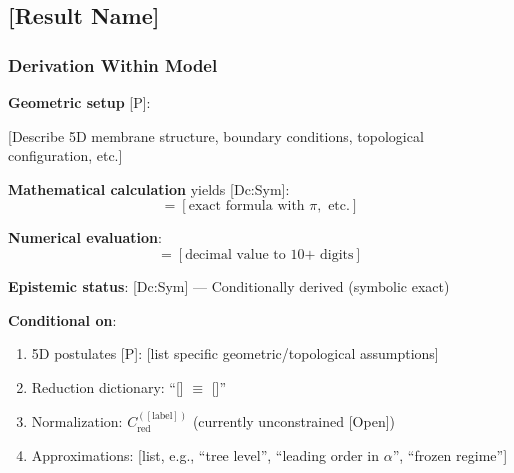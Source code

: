 
\subsection{[Result Name]}
\label{sec:[result_label]}


\subsubsection{Derivation Within Model}

\textbf{Geometric setup} [P]:

[Describe 5D membrane structure, boundary conditions, topological configuration, etc.]

\textbf{Mathematical calculation} yields [Dc:Sym]:
\begin{equation}
  [\text{quantity}] = [\text{exact formula with } \pi, \text{ etc.}]
  \label{eq:[result_formula]}
\end{equation}

\textbf{Numerical evaluation}:
\begin{equation}
  [\text{quantity}] = [\text{decimal value to 10+ digits}]
\end{equation}

\textbf{Epistemic status}: [Dc:Sym] --- Conditionally derived (symbolic exact)

\textbf{Conditional on}:
\begin{enumerate}
\item 5D postulates [P]: [list specific geometric/topological assumptions]
\item Reduction dictionary: ``[] $\equiv$ []''
\item Normalization: $C_{\mathrm{red}}^{([\text{label}])}$ (currently unconstrained [Open])
\item Approximations: [list, e.g., ``tree level'', ``leading order in $\alpha$'', ``frozen regime'']
\end{enumerate}

